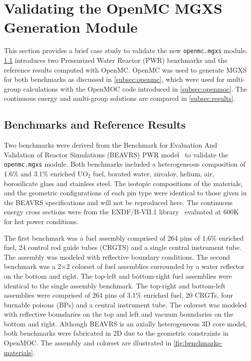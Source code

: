\section{Validating the OpenMC MGXS Generation Module}
\label{sec:validate}

This section provides a brief case study to validate the new \texttt{openmc.mgxs} module. \cref{subsec:benchmarks} introduces two Pressurized Water Reactor (PWR) benchmarks and the reference results computed with OpenMC. OpenMC was used to generate MGXS for both benchmarks as discussed in \cref{subsec:openmc}, which were used for multi-group calculations with the OpenMOC code introduced in \cref{subsec:openmoc}. The continuous energy and multi-group solutions are compared in \cref{subsec:results}.


\subsection{Benchmarks and Reference Results}
\label{subsec:benchmarks}

Two benchmarks were derived from the Benchmark for Evaluation And Validation of Reactor Simulations (BEAVRS) PWR model~\cite{horelik2013beavrs} to validate the \texttt{openmc.mgxs} module. Both benchmarks included a heterogeneous composition of 1.6\% and 3.1\% enriched UO$_2$ fuel, borated water, zircaloy, helium, air, borosilicate glass and stainless steel. The isotopic compositions of the materials, and the geometric configurations of each pin type were identical to those given in the BEAVRS specifications and will not be reproduced here. The continuous energy cross sections were from the ENDF/B-VII.1 library~\cite{mcnpx2003manual} evaluated at 600K for hot power conditions.

The first benchmark was a fuel assembly comprised of 264 pins of 1.6\% enriched fuel, 24 control rod guide tubes (CRGTS) and a single central instrument tube. The assembly was modeled with reflective boundary conditions. The second benchmark was a 2$\times$2 colorset of fuel assemblies surrounded by a water reflector on the bottom and right. The top-left and bottom-right fuel assemblies were identical to the single assembly benchmark. The top-right and bottom-left assemblies were comprised of 264 pins of 3.1\% enriched fuel, 20 CRGTs, four burnable poisons (BPs) and a central instrument tube. The colorset was modeled with reflective boundaries on the top and left and vacuum boundaries on the bottom and right. Although BEAVRS is an axially heterogeneous 3D core model, both benchmarks were fabricated in 2D due to the geometric constraints in OpenMOC. The assembly and colorset are illustrated in \cref{fig:benchmarks-materials}.

